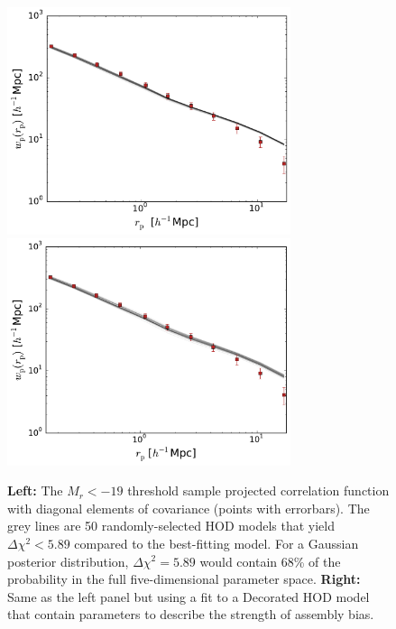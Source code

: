 \documentclass[usenatbib,usegraphicx,letterpaper]{mn2e}
\begin{document}
\begin{figure}
\begin{center}
\includegraphics[width=8.3cm]{Mr19samples.pdf}
\includegraphics[width=8.3cm]{Mr19ABsamples.pdf}
\caption{
{\bf Left:} The $M_r<-19$ threshold sample projected correlation function with diagonal elements of
covariance (points with errorbars). The grey lines are 50 randomly-selected HOD models that yield
$\Delta \chi^2 < 5.89$ compared to the best-fitting model. For a Gaussian posterior distribution,
$\Delta \chi^2 = 5.89$ would contain 68\% of the probability in the full five-dimensional parameter
space. {\bf Right:} Same as the left panel but using a
fit to a Decorated HOD model that contain parameters 
to describe the strength of assembly bias.
}
\label{fig:Mr19samples}
\end{center}
\end{figure}
\end{document}

